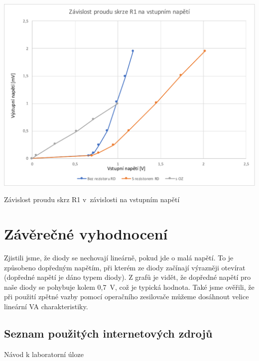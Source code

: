 \documentclass[a4paper,12pt]{article}   %
\begin{document}
\begin{graf}[h!]
    \centering
    \includegraphics[width=.7\textwidth]{proud.pdf}
    \caption{Závislost proudu skrz R1 v~závislosti na vstupním napětí}
\end{graf}

\section{Závěrečné vyhodnocení}
Zjistili jsme, že diody se nechovají lineárně, pokud jde o malá napětí. To je způsobeno dopředným napětím, při kterém ze diody začínají výrazněji otevírat (dopředné napětí je dáno typem diody). Z grafů je vidět, že dopředné napětí pro naše diody se pohybuje kolem 0,7~V, což je typická hodnota. Také jsme ověřili, že při použití zpětné vazby pomocí operačního zesilovače můžeme dosáhnout velice lineární VA charakteristiky.


\clearpage
\renewcommand{\refname}{Seznam použité literatury a~zdrojů informací} 

\begin{thebibliography}{99}

\subsection*{Seznam použitých internetových zdrojů}
     Návod k laboratorní úloze
    
\end{thebibliography}
\end{document}
